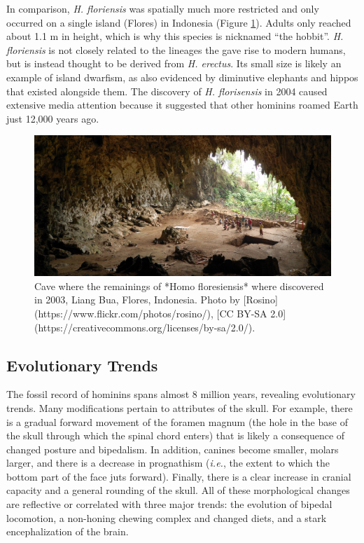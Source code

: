 \documentclass[
]{book}
\begin{document}
In comparison, \emph{H. floriensis} was spatially much more restricted and only occurred on a single island (Flores) in Indonesia (Figure \ref{fig:flores}). Adults only reached about 1.1 m in height, which is why this species is nicknamed ``the hobbit''. \emph{H. floriensis} is not closely related to the lineages the gave rise to modern humans, but is instead thought to be derived from \emph{H. erectus}. Its small size is likely an example of island dwarfism, as also evidenced by diminutive elephants and hippos that existed alongside them. The discovery of \emph{H. florisensis} in 2004 caused extensive media attention because it suggested that other hominins roamed Earth just 12,000 years ago.

\begin{figure}
\includegraphics[width=1\linewidth]{images/liangbua} \caption{Cave where the remainings of *Homo floresiensis* where discovered in 2003, Liang Bua, Flores, Indonesia. Photo by [Rosino](https://www.flickr.com/photos/rosino/), [CC BY-SA 2.0](https://creativecommons.org/licenses/by-sa/2.0/).}\label{fig:flores}
\end{figure}

\hypertarget{evolutionary-trends}{%
\subsection{Evolutionary Trends}\label{evolutionary-trends}}

The fossil record of hominins spans almost 8 million years, revealing evolutionary trends. Many modifications pertain to attributes of the skull. For example, there is a gradual forward movement of the foramen magnum (the hole in the base of the skull through which the spinal chord enters) that is likely a consequence of changed posture and bipedalism. In addition, canines become smaller, molars larger, and there is a decrease in prognathism (\emph{i.e.}, the extent to which the bottom part of the face juts forward). Finally, there is a clear increase in cranial capacity and a general rounding of the skull. All of these morphological changes are reflective or correlated with three major trends: the evolution of bipedal locomotion, a non-honing chewing complex and changed diets, and a stark encephalization of the brain.
\end{document}
